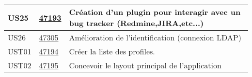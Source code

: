 \begin{center}
\begin{tabular}{|l|p{1.5cm}|p{14cm}|}
        \hline
US25	&	\href{https://redmine-projets.smile.fr/issues/47193}{47193}	&	Création d'un plugin pour interagir avec un bug tracker (Redmine,JIRA,etc...)	                \\
        \hline
US26	&	\href{https://redmine-projets.smile.fr/issues/47305}{47305}	&	Amélioration de l'identification (connexion LDAP)	                                            \\
        \hline
UST01	&	\href{https://redmine-projets.smile.fr/issues/47194}{47194}	&	Créer la liste des profiles.	                                                                \\
        \hline
UST02	&	\href{https://redmine-projets.smile.fr/issues/47195}{47195}	&	Concevoir le layout principal de l'application	                                                \\
        \hline
    \end{tabular}
\end{center}


	






































